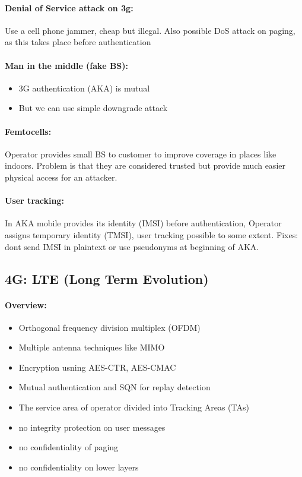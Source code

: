\paragraph{Denial of Service attack on 3g:} Use a cell phone jammer, cheap but illegal.
Also possible DoS attack on paging, as this takes place before authentication

\paragraph{Man in the middle (fake BS):}
\begin{itemize}
    \item 3G authentication (AKA) is mutual
    \item But we can use simple downgrade attack
\end{itemize}

\paragraph{Femtocells:} Operator provides small BS to customer to improve coverage in places like indoors. Problem is that they are considered trusted but provide much easier physical access for an attacker.

\paragraph{User tracking:}  In AKA mobile provides its identity (IMSI) before authentication, Operator assigns temporary identity (TMSI), user tracking possible to some extent. Fixes: dont send IMSI in plaintext or use pseudonyms at beginning of AKA.

\subsection{4G: LTE (Long Term Evolution)}

\paragraph{Overview:}
\begin{itemize}
    \item Orthogonal frequency division multiplex (OFDM)
    \item Multiple antenna techniques like MIMO
    \item Encryption usning AES-CTR, AES-CMAC
    \item Mutual authentication and SQN for replay detection
    \item The service area of operator divided into Tracking Areas (TAs)
    \item no integrity protection on user messages
    \item no confidentiality of paging
    \item no confidentiality on lower layers
\end{itemize}

